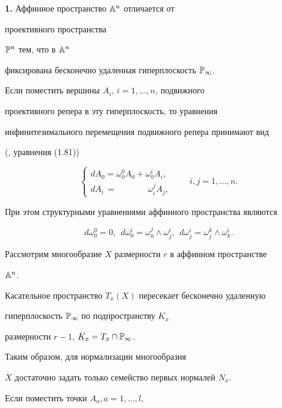 {\bf 1.} Аффинное пространство $\Bbb{A}^n$ отличается от


проективного пространства


$\Bbb{P}^n$ тем, что в $\Bbb{A}^n$


фиксирована бесконечно удаленная гиперплоскость $\Bbb{P}_\infty$.


Если поместить вершины $A_i$, $i = 1, \dotsc, n$, подвижного


проективного репера в эту гиперплоскость, то уравнения


инфинитезимального перемещения подвижного репера принимают вид


(\cite{AG04}, уравнения (1.81))


\begin{equation}\label{eq:45}


\begin{cases}


dA_0 = \omega^0_0 A_0 + \omega^i_0 A_i, \\
dA_i \,= \phantom{\omega^0_0 A_0 +}\ \omega^j_i A_j,


\end{cases}


\qquad i, j = 1, \dotsc, n.


\end{equation}


При этом структурными уравнениями аффинного пространства являются


\begin{equation*}


d \omega^0_0 = 0, \ \  d \omega^i_0 = \omega_0^j \wedge
\omega_j^i, \ \  d \omega^i_j = \omega_j^k \wedge \omega_k^i.
\end{equation*}



Рассмотрим многообразие $X$ размерности $r$ в аффинном пространстве


$\Bbb{A}^n$.


 Касательное пространство $T_x(X)$ пересекает бесконечно удаленную


гиперплоскость $\Bbb{P}_\infty$ по подпространству $K_x$


размерности $r - 1$, $K_x = T_x \cap \Bbb{P}_\infty$.


 Таким образом, для нормализации многообразия


$X$ достаточно задать только семейство первых нормалей $N_x$.


 Если поместить точки $A_a, a = 1, \dotsc, l$,


